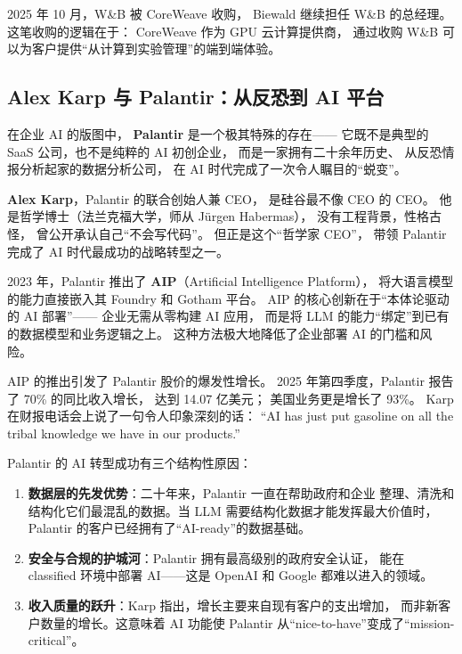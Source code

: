 2025 年 10 月，W\&B 被 CoreWeave 收购，
Biewald 继续担任 W\&B 的总经理。
这笔收购的逻辑在于：
CoreWeave 作为 GPU 云计算提供商，
通过收购 W\&B 可以为客户提供``从计算到实验管理''的端到端体验。


\subsection{Alex Karp 与 Palantir：从反恐到 AI 平台}
\label{subsec:alex-karp}

在企业 AI 的版图中，
\textbf{Palantir} 是一个极其特殊的存在——
它既不是典型的 SaaS 公司，也不是纯粹的 AI 初创企业，
而是一家拥有二十余年历史、
从反恐情报分析起家的数据分析公司，
在 AI 时代完成了一次令人瞩目的``蜕变''。

\textbf{Alex Karp}，Palantir 的联合创始人兼 CEO，
是硅谷最不像 CEO 的 CEO。
他是哲学博士（法兰克福大学，师从 Jürgen Habermas），
没有工程背景，性格古怪，
曾公开承认自己``不会写代码''。
但正是这个``哲学家 CEO''，
带领 Palantir 完成了 AI 时代最成功的战略转型之一。

2023 年，Palantir 推出了 \textbf{AIP}（Artificial Intelligence Platform），
将大语言模型的能力直接嵌入其 Foundry 和 Gotham 平台。
AIP 的核心创新在于``本体论驱动的 AI 部署''——
企业无需从零构建 AI 应用，
而是将 LLM 的能力``绑定''到已有的数据模型和业务逻辑之上。
这种方法极大地降低了企业部署 AI 的门槛和风险。

AIP 的推出引发了 Palantir 股价的爆发性增长。
2025 年第四季度，Palantir 报告了 70\% 的同比收入增长，
达到 14.07 亿美元；
美国业务更是增长了 93\%。
Karp 在财报电话会上说了一句令人印象深刻的话：
``AI has just put gasoline on all the tribal knowledge we have in our products.''

\begin{whybox}
Palantir 的 AI 转型成功有三个结构性原因：
\begin{enumerate}[noitemsep]
  \item \textbf{数据层的先发优势}：二十年来，Palantir 一直在帮助政府和企业
        整理、清洗和结构化它们最混乱的数据。当 LLM 需要结构化数据才能发挥最大价值时，
        Palantir 的客户已经拥有了``AI-ready''的数据基础。
  \item \textbf{安全与合规的护城河}：Palantir 拥有最高级别的政府安全认证，
        能在 classified 环境中部署 AI——这是 OpenAI 和 Google 都难以进入的领域。
  \item \textbf{收入质量的跃升}：Karp 指出，增长主要来自现有客户的支出增加，
        而非新客户数量的增长。这意味着 AI 功能使 Palantir
        从``nice-to-have''变成了``mission-critical''。
\end{enumerate}
\end{whybox}


